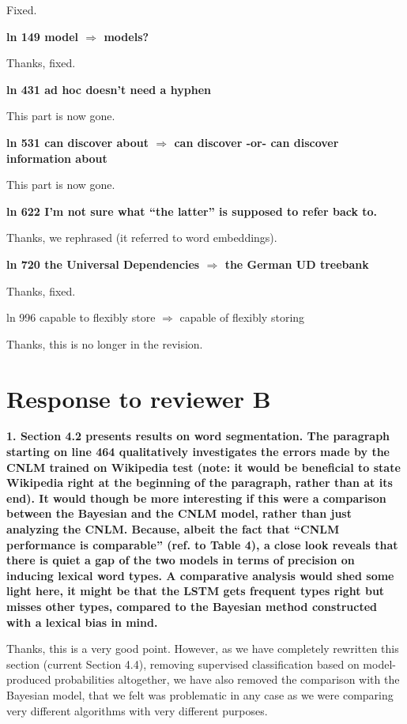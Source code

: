 \documentclass{article}[11pt,a4paper,oneside]
\begin{document}
Fixed.
\newline

\textbf{ln 149 model $\Rightarrow$ models?}

Thanks, fixed.
\newline

\textbf{ln 431 ad hoc doesn't need a hyphen}

This part is now gone.
\newline

\textbf{ln 531 can discover about $\Rightarrow$ can discover -or- can discover information
about}

This part is now gone.
\newline

\textbf{ln 622 I'm not sure what ``the latter'' is supposed to refer back to.}

Thanks, we rephrased (it referred to word embeddings).
\newline

\textbf{ln 720 the Universal Dependencies $\Rightarrow$ the German UD treebank}

Thanks, fixed.

ln 996 capable to flexibly store $\Rightarrow$ capable of flexibly storing

Thanks, this is no longer in the revision.


\section{Response to reviewer B}

\textbf{1. Section 4.2 presents results on word segmentation. The paragraph starting on line 464 qualitatively investigates the errors made by the CNLM trained on Wikipedia test (note: it would be beneficial to state Wikipedia right at the beginning of the paragraph, rather than at its end). It would though be more interesting if this were a comparison between the Bayesian and the CNLM model, rather than just analyzing the CNLM.  Because, albeit the fact that ``CNLM performance is comparable'' (ref. to Table 4), a close look reveals that there is quiet a gap of the two models in terms of precision on inducing lexical word types. A comparative analysis would shed some light here, it might be that the LSTM gets frequent types right but misses other types, compared to the Bayesian method constructed with a lexical bias in mind.}

Thanks, this is a very good point. However, as we have completely rewritten this section (current Section 4.4), removing supervised classification based on model-produced probabilities altogether, we have also removed the comparison with the Bayesian model, that we felt was problematic in any case as we were comparing very different algorithms with very different purposes.
\newline
\end{document}
